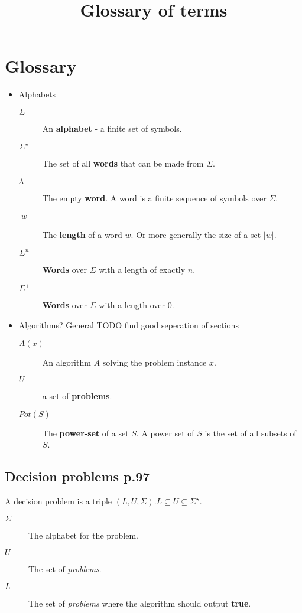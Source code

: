 \documentclass[a4paper,10pt]{article}
\title{Glossary of terms}
\date{}
\author{}
\begin{document}
\maketitle

\section{Glossary}

\begin{itemize}
\item Alphabets
	\begin{description}
	\item[$\Sigma$] An \textbf{alphabet} - a finite set of symbols.
	\item[$\Sigma ^\star$] The set of all \textbf{words} that can be made from $\Sigma$.
	\item[$\lambda$] The empty \textbf{word}. A word is a finite sequence of symbols over $\Sigma$.
	\item[$|w|$] The \textbf{length} of a word $w$. Or more generally the size of a set $|w|$.
	\item[$\Sigma ^n$] \textbf{Words} over $\Sigma$ with a length of exactly $n$.
	\item[$\Sigma ^+$] \textbf{Words} over $\Sigma$ with a length over 0.
	\end {description}
\item Algorithms? General TODO find good seperation of sections
	\begin{description}
	\item[$A(x)$] An algorithm $A$ solving the problem instance $x$.
	\item[$U$] a set of \textbf{problems}.
	\item[$Pot(S)$] The \textbf{power-set} of a set $S$. A power set of $S$ is the set of all subsets of $S$.
	\end{description}
\end{itemize}

\subsection{Decision problems p.97}
A decision problem is a triple $(L,U,\Sigma). L \subseteq U \subseteq \Sigma ^\star$.
\begin{description}
\item[$\Sigma$] The alphabet for the problem.
\item[$U$] The set of \emph{problems}.
\item[$L$] The set of \emph{problems} where the algorithm should output \textbf{true}.
\end{description}
\end{document}
